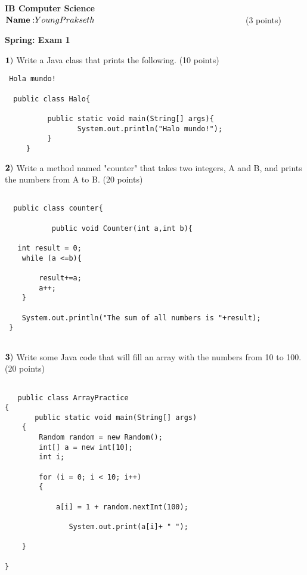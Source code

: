 \documentclass{article}
\begin{document}

\doublespacing
\textbf{IB Computer Science }                        %
 \hfill                             %
$ {\bf Name: } Young Prakseth{\hspace{2.5in}}$(3 points)

\begin{centering}
\vspace{1cm}
\textbf{Spring: Exam 1}\\
\end{centering}
\vspace{1cm}
 

  
 
 $\bf{1)}$ Write a Java class that prints the following. (10 points)
  
   \begin{verbatim}
 Hola mundo! 
 
  public class Halo{
  
          public static void main(String[] args){
                 System.out.println("Halo mundo!");
          }
     }         
 \end{verbatim}
 
 $\bf{2)}$ Write a method named "counter" that takes two integers, A and B, and prints the numbers from A to B. (20 points)
  \vspace{0.5cm} 
  
   \begin{verbatim}

  public class counter{
          
           public void Counter(int a,int b){

   int result = 0;
    while (a <=b){
    
        result+=a;
        a++; 
    }   

    System.out.println("The sum of all numbers is "+result); 
 }
 
   \end{verbatim}
   
 
  $\bf{3)}$ Write some Java code that will fill an array with the numbers from 10 to 100.  (20 points)
   \vspace{0.5cm}
   
   \begin{verbatim}

   public class ArrayPractice
{
       public static void main(String[] args)
    {   
        Random random = new Random();
        int[] a = new int[10];
        int i;

        for (i = 0; i < 10; i++)
        { 

            a[i] = 1 + random.nextInt(100);

               System.out.print(a[i]+ " ");

    }

}

\end{verbatim}
\end{document}
